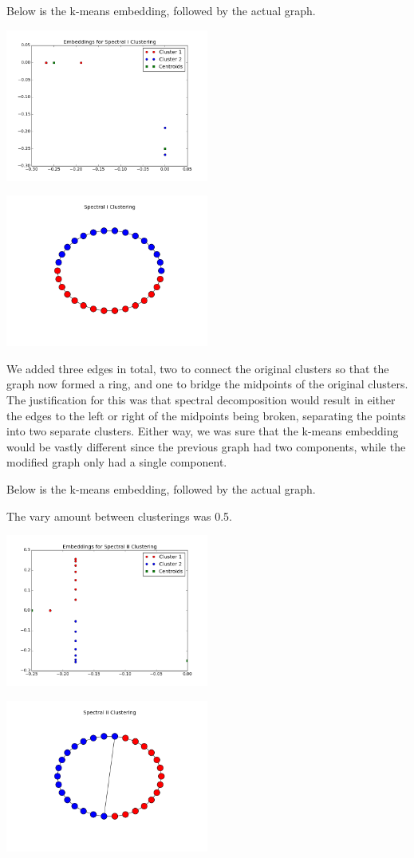 \documentclass[12pt]{article}
\begin{document}
\begin{enumerate}
Below is the k-means embedding, followed by the actual graph.

\includegraphics[width=0.5\textwidth]{Embeddings_for_Spectral_I_Clustering.png}

\includegraphics[width=0.5\textwidth]{Spectral_I_Clustering.png}

We added three edges in total, two to connect the original clusters so that the graph now formed a ring, and one to bridge the midpoints of the original clusters. The justification for this was that spectral decomposition would result in either the edges to the left or right of the midpoints being broken, separating the points into two separate clusters. Either way, we was sure that the k-means embedding would be vastly different since the previous graph had two components, while the modified graph only had a single component.

Below is the k-means embedding, followed by the actual graph.

The vary amount between clusterings was 0.5.

\includegraphics[width=0.5\textwidth]{Embeddings_for_Spectral_II_Clustering.png}

\includegraphics[width=0.5\textwidth]{Spectral_II_Clustering.png}

\end{enumerate}
\end{document}
